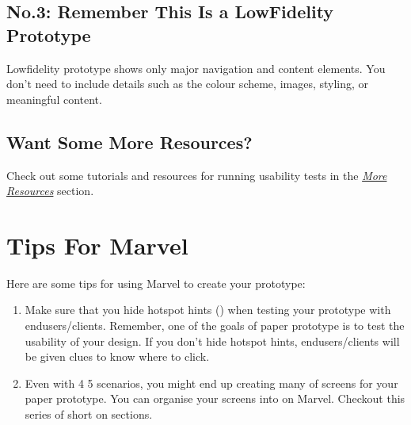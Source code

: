 \documentclass[letterpaper,10pt,english]{jupyterBook}
\begin{document}
\subsection{No.3: Remember This Is a Low\sphinxhyphen{}Fidelity Prototype}
\label{\detokenize{appendices/appendix_e/marvel_guide:no-3-remember-this-is-a-low-fidelity-prototype}}
\sphinxAtStartPar
Low\sphinxhyphen{}fidelity prototype shows only major navigation and content elements. You don’t need to include details such as
the colour scheme, images, styling, or meaningful content.


\subsection{Want Some More Resources?}
\label{\detokenize{appendices/appendix_e/marvel_guide:want-some-more-resources}}
\sphinxAtStartPar
Check out some tutorials and resources for running usability tests in the {\hyperref[\detokenize{appendices/appendix_e/marvel_guide:more-resources}]{\emph{More Resources}}} section.


\section{Tips For Marvel}
\label{\detokenize{appendices/appendix_e/marvel_guide:tips-for-marvel}}
\sphinxAtStartPar
Here are some tips for using Marvel to create your prototype:
\begin{enumerate}
%
\item {} 
\sphinxAtStartPar
Make sure that you hide hotspot hints
()
when testing your prototype with end\sphinxhyphen{}users/clients. Remember, one of the goals of paper prototype is to test the
usability of your design. If you don’t hide hotspot hints, end\sphinxhyphen{}users/clients will be given clues to know where to
click.

\item {} 
\sphinxAtStartPar
Even with 4 \sphinxhyphen{} 5 scenarios, you might end up creating many of screens for your paper prototype. You can organise
your screens into  on Marvel. Checkout this series of short
on sections.

\end{enumerate}
\end{document}
